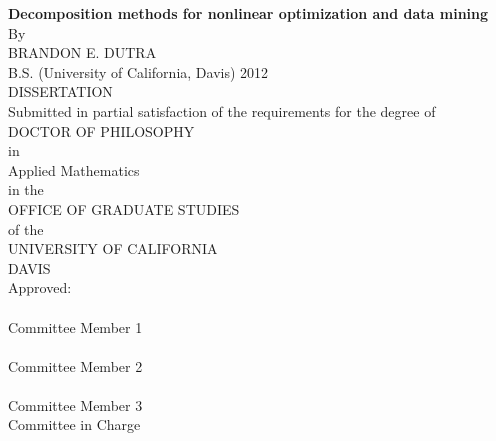 \begin{center}
   \null\vfill
   \textbf{%
     Decomposition methods for nonlinear optimization and data mining
   }%
   \\
   \bigskip
   By \\
   \bigskip
   BRANDON E. DUTRA \\
   \bigskip
   B.S. (University of California, Davis) 2012 \\
   \bigskip
   DISSERTATION \\
   \bigskip
   Submitted in partial satisfaction of the requirements for the
   degree of \\
   \bigskip
   DOCTOR OF PHILOSOPHY \\
   \bigskip
   in \\
   \bigskip
   Applied Mathematics \\
   \bigskip
   in the \\
   \bigskip
   OFFICE OF GRADUATE STUDIES \\
   \bigskip        
   of the \\
   \bigskip
   UNIVERSITY OF CALIFORNIA \\
   \bigskip
   DAVIS \\
   \bigskip
   Approved: \\
   \bigskip
   \bigskip
   \makebox[3in]{\hrulefill} \\
   Committee Member 1 \\
   \bigskip
   \bigskip
   \makebox[3in]{\hrulefill} \\
   Committee Member 2 \\
   \bigskip
   \bigskip
   \makebox[3in]{\hrulefill} \\
   Committee Member 3 \\
   \bigskip
   Committee in Charge \\
    \\
   \vfill
\end{center}
